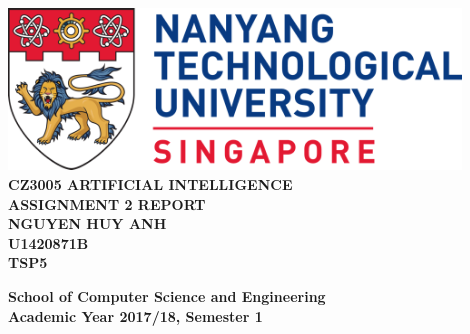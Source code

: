 \documentclass[11pt]{report}
\begin{document}
\begin{titlepage}
    \begin{center}
    
    \includegraphics[width=0.9\textwidth]{ntu_logo}
    \\[6cm]
    
    \uppercase{
    \textbf{CZ3005 Artificial Intelligence}\\
    \textbf{Assignment 2 Report}
    \\[2cm]
    \textbf{Nguyen Huy Anh}\\
    \textbf{U1420871B}\\
    \textbf{TSP5}
    }
    
    \vfill
    
    \textbf{School of Computer Science and Engineering}
    \\
    \textbf{Academic Year 2017/18, Semester 1}
    
    \end{center}
\end{titlepage}
\end{document}
